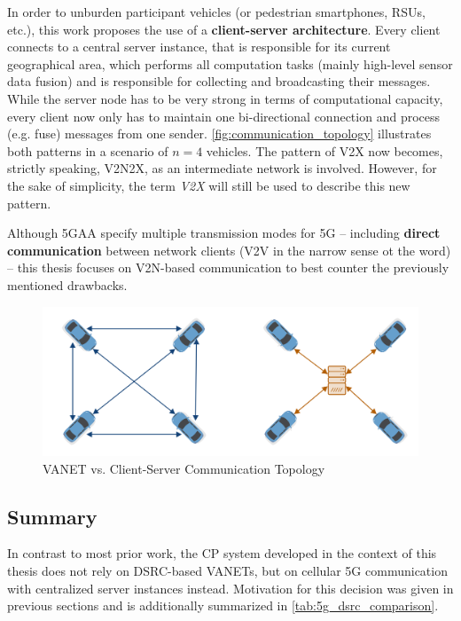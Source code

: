 In order to unburden participant vehicles (or pedestrian smartphones, RSUs, etc.), this work proposes the use of a \textbf{client-server architecture}. Every client connects to a central server instance, that is responsible for its current geographical area, which performs all computation tasks (mainly high-level sensor data fusion) and is responsible for collecting and broadcasting their messages. While the server node has to be very strong in terms of computational capacity, every client now only has to maintain one bi-directional connection and process (e.g. fuse) messages from one sender. \autoref{fig:communication_topology} illustrates both patterns in a scenario of $n = 4$ vehicles. The pattern of V2X now becomes, strictly speaking, V2N2X, as an intermediate network is involved. However, for the sake of simplicity, the term \textit{V2X} will still be used to describe this new pattern. 

Although 5GAA specify multiple transmission modes for 5G \cite{5GAutomotiveAssociation2016} – including \textbf{direct communication} between network clients (V2V in the narrow sense ot the word) – this thesis focuses on V2N-based communication to best counter the previously mentioned drawbacks. 

\begin{figure}[h]
	\centering
	\includegraphics[width=0.9\linewidth]{98_images/topology_comparison}
	\caption{VANET vs. Client-Server Communication Topology}
	\label{fig:communication_topology}
\end{figure}


\subsection{Summary}
\label{subsec:concept_design:5g:summary}
In contrast to most prior work, the CP system developed in the context of this thesis does not rely on DSRC-based VANETs, but on cellular 5G communication with centralized server instances instead. Motivation for this decision was given in previous sections and is additionally summarized in \autoref{tab:5g_dsrc_comparison}.

